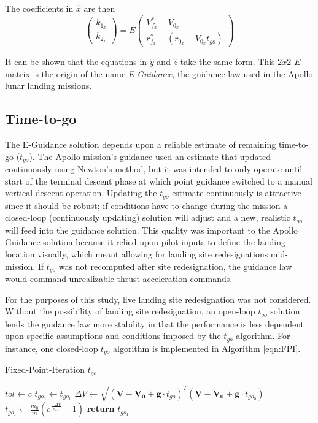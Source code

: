 The coefficients in $\hat{x}$ are then
\begin{equation}
\begin{pmatrix}
k_{1_x} \\
k_{2_x}
\end{pmatrix}
= E
\begin{pmatrix}
V_{f_x}^* - V_{0_x} \\ 
r_{f_x}^* - (r_{0_x} + V_{0_x}t_{go}) 
\end{pmatrix}
\end{equation}

It can be shown that the equations in $\hat{y}$ and $\hat{z}$ take the same form. This $2x2$ $E$ matrix is the origin of the name \textit{E-Guidance}, the guidance law used in the Apollo lunar landing missions.

\subsection{Time-to-go}
The E-Guidance solution depends upon a reliable estimate of remaining time-to-go ($t_{go}$). The Apollo mission's guidance used an estimate that updated continuously using Newton's method, but it was intended to only operate until start of the terminal descent phase at which point guidance switched to a manual vertical descent operation. Updating the $t_{go}$ estimate continuously is attractive since it should be robust; if conditions have to change during the mission a closed-loop (continuously updating) solution will adjust and a new, realistic $t_{go}$ will feed into the guidance solution. This quality was important to the Apollo Guidance solution because it relied upon pilot inputs to define the landing location visually, which meant allowing for landing site redesignations mid-mission. If $t_{go}$ was not recomputed after site redesignation, the guidance law would command unrealizable thrust acceleration commands.

For the purposes of this study, live landing site redesignation was not considered. Without the possibility of landing site redesignation, an open-loop $t_{go}$ solution lends the guidance law more stability in that the performance is less dependent upon specific assumptions and conditions imposed by the $t_{go}$ algorithm. For instance, one closed-loop $t_{go}$ algorithm is implemented in Algorithm \ref{eqn:FPI}.

\begin{algorithm}
	\caption{Fixed-Point-Iteration $t_{go}$}\label{eqn:FPI}
	\begin{algorithmic}[1]
		\State $tol\gets c$
		\State $t_{go_0} \gets t_{go_1}$
		\State $\Delta V \gets \sqrt{(\boldsymbol{V}-\boldsymbol{V_0} + \boldsymbol{g}\cdot t_{go})^T(\boldsymbol{V}-\boldsymbol{V_0} + \boldsymbol{g}\cdot t_{go_0})}$
		\State $t_{go_1} \gets \frac{m_0}{\dot{m}}\left(e^{\frac{-\Delta V}{v_{ex}}}-1\right)$ 
		\EndWhile
		\State \textbf{return} $t_{go_1}$
		\EndProcedure
	\end{algorithmic}
\end{algorithm}

